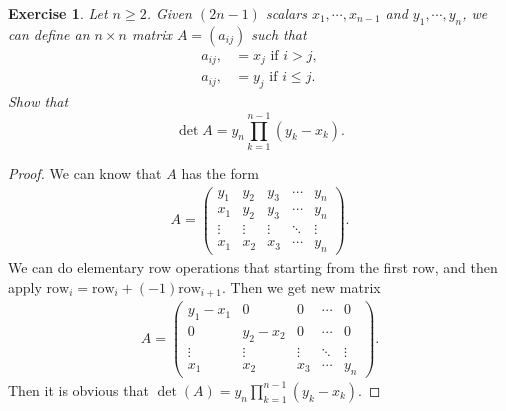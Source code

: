 \documentclass[10pt]{book}
\newtheorem{exercise}{Exercise}[section]
\theoremstyle{definition}
\numberwithin{equation}{chapter}
\begin{document}
\medskip

\begin{exercise}
Let $n\geq2$. Given $\left(  2n-1\right)  $ scalars $x_{1}%
,\cdots,x_{n-1}$ and $y_{1},\cdots,y_{n}$, we can define an $n\times n$ matrix
$A=\left(  a_{ij}\right)  $ such that%
\begin{align*}
    a_{ij}, &  =x_{j}\text{ if }i>j,\\
    a_{ij}, &  =y_{j}\text{ if }i\leq j.
\end{align*}
Show that%
$$
\det A=y_{n}%
{\displaystyle\prod\limits_{k=1}^{n-1}}
\left(  y_{k}-x_{k}\right).
$$
\end{exercise}
\begin{proof}
We can know that $A$ has the form 
\begin{align*}
    A = \begin{pmatrix}
    y_1 & y_2 & y_3 & \cdots & y_n \\
    x_1 & y_2 & y_3 & \cdots & y_n \\
    \vdots & \vdots & \vdots & \ddots & \vdots \\
    x_1 & x_2 & x_3 & \cdots & y_n
    \end{pmatrix}.
\end{align*}
We can do elementary row operations that starting from the first row, and then apply $\text{row}_i=\text{row}_i+(-1)\text{row}_{i+1}$. Then we get new matrix
\begin{align*}
    A = \begin{pmatrix}
    y_1-x_1 & 0 & 0 & \cdots & 0 \\
    0 & y_2-x_2 & 0 & \cdots & 0 \\
    \vdots & \vdots & \vdots & \ddots & \vdots \\
    x_1 & x_2 & x_3 & \cdots & y_n
    \end{pmatrix}.
\end{align*}
Then it is obvious that $\det(A)=y_n \prod_{k=1}^{n-1} (y_k-x_k)$.
\end{proof}

\medskip
\end{document}
